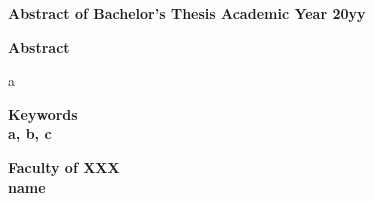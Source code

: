 \begin{center}
\textbf{\large Abstract of Bachelor's Thesis Academic Year 20yy}

\vspace{6mm}

\textbf{\large }
\end{center}

\begin{flushleft}
\textbf{Abstract}\\
\end{flushleft}

\vspace{10mm}
a

\begin{flushleft}
\textbf{Keywords}\\
 \textbf{a, b, c}

\end{flushleft}

\begin{flushright}
\textbf{Faculty of XXX}\\
\textbf{name}\\
\end{flushright}
\newpage
